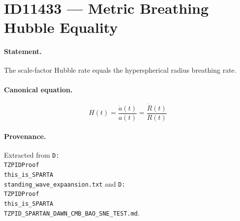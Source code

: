 \section*{ID11433 --- Metric Breathing Hubble Equality}

\paragraph{Statement.}
The scale-factor Hubble rate equals the hyperspherical radius breathing rate.

\paragraph{Canonical equation.}
\[
H(t)=\frac{\dot a(t)}{a(t)}=\frac{\dot R(t)}{R(t)}
\]

\paragraph{Provenance.}
Extracted from \texttt{D:\\TZPIDProof\\this\_is\_SPARTA\\standing\_wave\_expaansion.txt} and \texttt{D:\\TZPIDProof\\this\_is\_SPARTA\\TZPID\_SPARTAN\_DAWN\_CMB\_BAO\_SNE\_TEST.md}.
